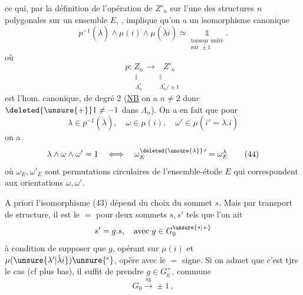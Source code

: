 ce qui, par la définition de l'opération de $Z'_n$ sur l'une des structures $n$ polygonales sur un ensemble $E$, , implique qu'on a un isomorphisme canonique
\[
p^{-1}(\dot\lambda)\wedge\mu(i)\wedge\mu(\dot\lambda i)\simeq
\underset{\substack{\text{torseur unité}\\\text{sur }\pm1}}{\mathbb{1}}.
\tag*{(43)}
\]
où
\[
 p:\underset{\substack{\Vert\\\Lambda_n^*}}{Z_n}\longrightarrow
 \underset{\substack{\Vert\\\Lambda_n^*/\pm1}}{Z'_n}
\]
 est l'hom. canonique,  de degré 2 (\uline{NB} on a  $n\ne2$ donc $\deleted{\unsure{+}}1\ne-1$ dans $\Lambda_n$). On a en fait que pour
\[
\lambda\in p^{-1}(\dot\lambda),\quad \omega\in\mu(i),\quad \omega'\in\mu(i'=\dot\lambda.i)
\]
on a
\[
\lambda\wedge\omega\wedge\omega'=1\quad\Longleftrightarrow\quad
\omega^{\deleted{\unsure{\lambda}}\,\prime}_E=\omega_E^\lambda
\tag*{(44)}
\]
où $\omega_E,\omega'_E$ sont  permutations circulaires de l'ensemble-étoile $E$ qui correspondent aux orientations $\omega,\omega'$.

A priori l'isomorphisme (43) dépend du choix du sommet $s$. Mais par transport de structure, il est le $=$ pour deux sommets $s,s'$ tels que l'on ait
\[
s'=g.s,\quad\text{avec }g\in G_0^{\unsure{*|+}}
\]
à condition de supposer que $g$, opérant sur $\mu(i)$ et $\mu(\unsure{\lambda'|\dot\lambda i})\unsure{\vphantom{i}^{\epsilon}}$, opère avec le $=$ signe. Si on admet que c'est tjrs le cas (cf plus bas), il suffit de prendre $g\in G_0^+$,  commune
\[
 G_0\xrightarrow{\mathrm{sg}}\pm1\,,\tag*{(45)}
\]
